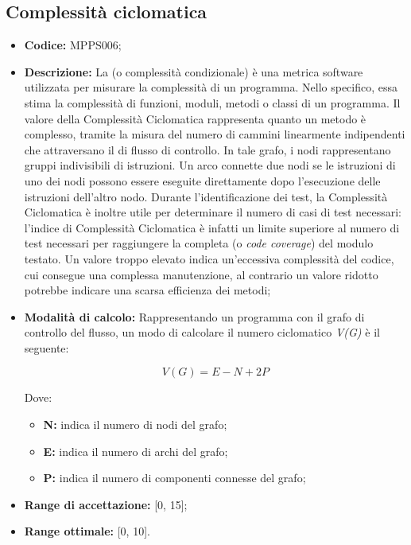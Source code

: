 \documentclass[openany,12pt,a4paper]{report}
\begin{document}
\subsection{Complessità ciclomatica}

\begin{itemize}
    \item \textbf{Codice:} MPPS006;

    \item \textbf{Descrizione:} La  (o complessità condizionale) è una metrica software utilizzata per misurare la complessità di un programma. Nello specifico, essa stima la complessità di funzioni, moduli, metodi o classi di un programma. Il valore della Complessità Ciclomatica rappresenta quanto un metodo è complesso, tramite la misura del numero di cammini linearmente indipendenti che attraversano il  di flusso di controllo. In tale grafo, i nodi rappresentano gruppi indivisibili di istruzioni. Un arco connette due nodi se le istruzioni di uno dei nodi possono essere eseguite direttamente dopo l'esecuzione delle istruzioni dell'altro nodo. Durante l’identificazione dei test, la Complessità Ciclomatica è inoltre utile per determinare il numero di casi di test necessari: l’indice di Complessità Ciclomatica è infatti un limite superiore al numero di test necessari per raggiungere la completa  (o \textit{code coverage}) del modulo testato. Un valore troppo elevato indica un'eccessiva complessità del codice, cui consegue una complessa manutenzione, al contrario un valore ridotto potrebbe indicare una scarsa efficienza dei metodi;

    \item \textbf{Modalità di calcolo:} Rappresentando un programma con il grafo di controllo del flusso, un modo di calcolare il numero ciclomatico \textit{V(G)} è il seguente:
    
    \[ V(G) = E - N + 2P \]
    
    Dove:
    
    \begin{itemize}
        \item \textbf{N:} indica il numero di nodi del grafo;
        \item \textbf{E:} indica il numero di archi del grafo;
        \item \textbf{P:} indica il numero di componenti connesse del grafo;
    \end{itemize}
    
    \item \textbf{Range di accettazione:} [0, 15];
    \item \textbf{Range ottimale:} [0, 10].
\end{itemize}
\end{document}
